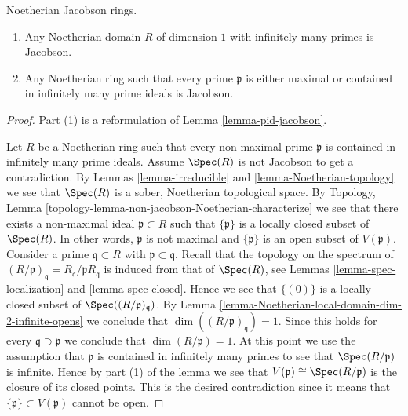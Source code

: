 \begin{lemma}
\label{lemma-noetherian-dim-1-Jacobson}
Noetherian Jacobson rings.
\begin{enumerate}
\item Any Noetherian domain $R$ of dimension $1$
with infinitely many primes is Jacobson.
\item Any Noetherian ring such that every prime
$\mathfrak p$ is either maximal or contained in
infinitely many prime ideals is Jacobson.
\end{enumerate}
\end{lemma}

\begin{proof}
Part (1) is a reformulation of Lemma \ref{lemma-pid-jacobson}.

\medskip\noindent
Let $R$ be a Noetherian ring such that
every non-maximal prime $\mathfrak p$ is contained
in infinitely many prime ideals.
Assume $\Spec(R)$ is not Jacobson to get
a contradiction.
By Lemmas \ref{lemma-irreducible}
and \ref{lemma-Noetherian-topology}
we see that $\Spec(R)$ is a sober, Noetherian topological space.
By Topology, Lemma \ref{topology-lemma-non-jacobson-Noetherian-characterize}
we see that there exists a non-maximal ideal $\mathfrak p \subset R$
such that $\{\mathfrak p\}$ is a locally closed subset of
$\Spec(R)$. In other words, $\mathfrak p$ is not maximal
and $\{\mathfrak p\}$ is an open subset of $V(\mathfrak p)$.
Consider a prime $\mathfrak q \subset R$ with
$\mathfrak p \subset \mathfrak q$. Recall that the topology on the spectrum of
$(R/\mathfrak p)_{\mathfrak q} = R_{\mathfrak q}/\mathfrak pR_{\mathfrak q}$
is induced from that of $\Spec(R)$, see Lemmas
\ref{lemma-spec-localization} and \ref{lemma-spec-closed}.
Hence we see that $\{(0)\}$ is a locally closed subset of
$\Spec((R/\mathfrak p)_{\mathfrak q})$. By
Lemma \ref{lemma-Noetherian-local-domain-dim-2-infinite-opens}
we conclude that $\dim((R/\mathfrak p)_{\mathfrak q}) = 1$.
Since this holds for every $\mathfrak q \supset \mathfrak p$
we conclude that $\dim(R/\mathfrak p) = 1$. At this point we use
the assumption that $\mathfrak p$ is contained in infinitely many
primes to see that $\Spec(R/\mathfrak p)$ is infinite.
Hence by part (1) of the lemma we see that
$V(\mathfrak p) \cong \Spec(R/\mathfrak p)$
is the closure of its closed points.
This is the desired contradiction since it means that
$\{\mathfrak p\} \subset V(\mathfrak p)$ cannot be open.
\end{proof}





















